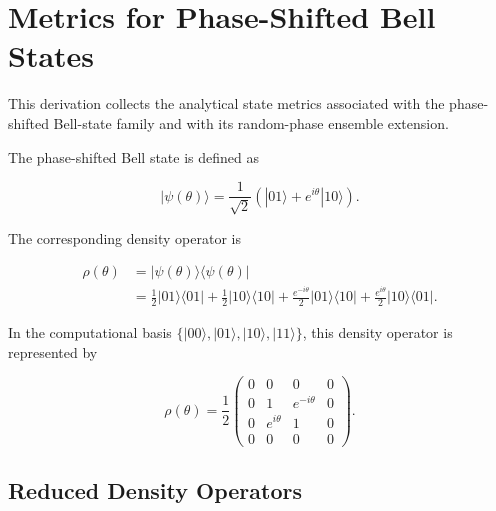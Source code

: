 
\section{Metrics for Phase-Shifted Bell States}

This derivation collects the analytical state metrics associated with the phase-shifted Bell-state family and with its random-phase ensemble extension.

\medskip

The phase-shifted Bell state is defined as

\begin{equation}
|\psi(\theta)\rangle
=
\frac{1}{\sqrt{2}}
\left(
|01\rangle + e^{i\theta}|10\rangle
\right).
\label{eq:d5_phase_shifted_bell_state}
\end{equation}

The corresponding density operator is

\begin{align}
\rho(\theta)
&=
|\psi(\theta)\rangle\langle\psi(\theta)|
\nonumber
\\
&=
\frac{1}{2}|01\rangle\langle 01|
+
\frac{1}{2}|10\rangle\langle 10|
+
\frac{e^{-i\theta}}{2}|01\rangle\langle 10|
+
\frac{e^{i\theta}}{2}|10\rangle\langle 01|.
\label{eq:d5_phase_shifted_density_operator}
\end{align}

In the computational basis \( \{|00\rangle, |01\rangle, |10\rangle, |11\rangle\} \), this density operator is represented by

\begin{equation}
\rho(\theta)
=
\frac{1}{2}
\begin{pmatrix}
0 & 0 & 0 & 0 \\
0 & 1 & e^{-i\theta} & 0 \\
0 & e^{i\theta} & 1 & 0 \\
0 & 0 & 0 & 0
\end{pmatrix}.
\label{eq:d5_phase_shifted_density_matrix}
\end{equation}


\subsection{Reduced Density Operators}

